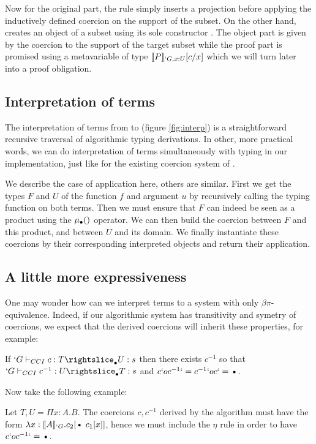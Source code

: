 \documentclass{llncs}
\begin{document}
Now for the original part, the  rule simply inserts a
projection before applying the inductively defined coercion on the
support of the subset. On the other hand,  creates an
object of a subset using its sole constructor . The object
part is given by the coercion to the support of the target subset
while the proof part is promised using a metavariable of type $\llbracket P \rrbracket_{`G, x : U}[c/x]$ which
we will turn later into a proof obligation. 

\subsection{Interpretation of terms}
The interpretation of terms from \Russell to \CCq (figure
\vref{fig:interp}) is a straightforward
recursive traversal of algorithmic typing derivations. In other, more
practical words, we can do interpretation of terms simultaneously with
typing in our implementation, just like for the existing coercion system
of \Coq. 


We describe the case of application here, others are similar. First we
get the types $F$ and $U$ of the function $f$ and argument $u$ by recursively calling the
typing function on both terms. Then we must ensure that $F$ can indeed
be seen as a product using the $\mualgo$ operator. We can then build
the coercion between $F$ and this product, and between $U$ and its
domain. We finally instantiate these coercions by their corresponding
interpreted objects and return their application.

\subsection{A little more expressiveness}
One may wonder how can we interpret \Russell terms to a system with only
$\beta\pi$-equivalence. 
Indeed, if our algorithmic system has transitivity and symetry of
coercions, we expect that the derived coercions will inherit these
properties, for example:
\begin{proposition}
  If $\subimpl{`G}{c}{T}{U}{s}$ then there exists $c^{-1}$ so that
  $\subimpl{`G}{c^{-1}}{U}{T}{s}$ and $c `o c^{-1} `= c^{-1} `o c `=
  \ctxdot$.
\end{proposition}

Now take the following example:
\begin{example}
  Let $T, U = \Pi x : A.B$. The coercions $c, c^{-1}$ derived by
  the algorithm must have the form $\lambda x :
  \ip{A}{`G}.c_2[\ctxdot~c_1[x]]$, hence we must include the $\eta$
  rule in order to have $c `o c^{-1} `= \ctxdot$.
\end{example}
\end{document}
